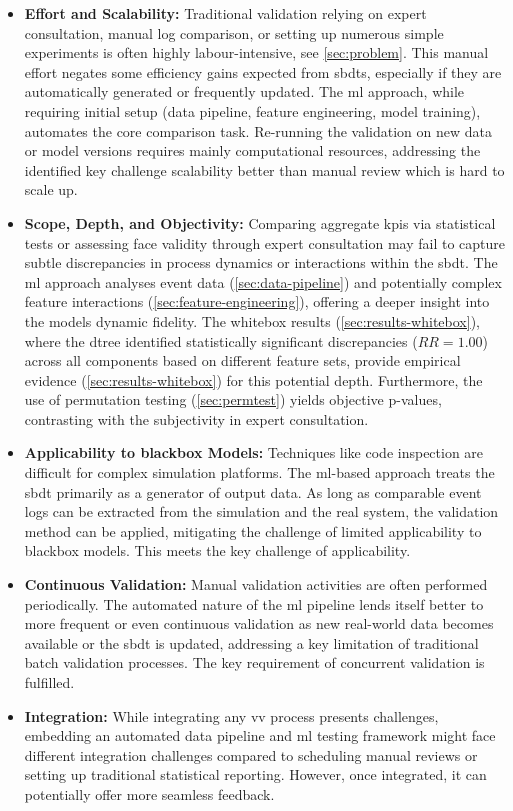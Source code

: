 \begin{itemize}
  \item \textbf{Effort and Scalability:} Traditional validation relying on expert consultation, manual log comparison, or setting up numerous simple experiments is often highly labour-intensive, see \autoref{sec:problem}. This manual effort negates some efficiency gains expected from \gls{sbdt}s, especially if they are automatically generated or frequently updated. The \gls{ml} approach, while requiring initial setup (data pipeline, feature engineering, model training), automates the core comparison task. Re-running the validation on new data or model versions requires mainly computational resources, addressing the identified key challenge scalability better than manual review which is hard to scale up.

  \item \textbf{Scope, Depth, and Objectivity:} Comparing aggregate \gls{kpi}s via statistical tests or assessing face validity through expert consultation may fail to capture subtle discrepancies in process dynamics or interactions within the \gls{sbdt}. The \gls{ml} approach analyses event data (\autoref{sec:data-pipeline}) and potentially complex feature interactions (\autoref{sec:feature-engineering}), offering a deeper insight into the models dynamic fidelity. The whitebox results (\autoref{sec:results-whitebox}), where the \gls{dtree} identified statistically significant discrepancies ($RR=1.00$) across all components based on different feature sets, provide empirical evidence (\autoref{sec:results-whitebox}) for this potential depth. Furthermore, the use of permutation testing (\autoref{sec:permtest}) yields objective p-values, contrasting with the subjectivity in expert consultation.

  \item \textbf{Applicability to blackbox Models:} Techniques like code inspection are difficult for complex simulation platforms. The \gls{ml}-based approach treats the \gls{sbdt} primarily as a generator of output data. As long as comparable event logs can be extracted from the simulation and the real system, the validation method can be applied, mitigating the challenge of limited applicability to blackbox models. This meets the key challenge of applicability.

  \item \textbf{Continuous Validation:} Manual validation activities are often performed periodically. The automated nature of the \gls{ml} pipeline lends itself better to more frequent or even continuous validation as new real-world data becomes available or the \gls{sbdt} is updated, addressing a key limitation of traditional batch validation processes. The key requirement of concurrent validation is fulfilled.

  \item \textbf{Integration:} While integrating any \gls{vv} process presents challenges, embedding an automated data pipeline and \gls{ml} testing framework might face different integration challenges compared to scheduling manual reviews or setting up traditional statistical reporting. However, once integrated, it can potentially offer more seamless feedback.
\end{itemize}

